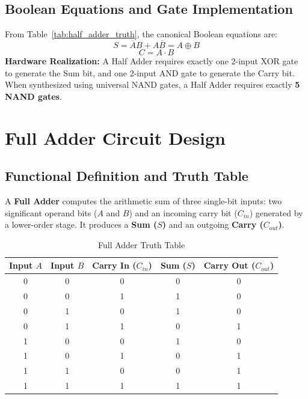 \subsection{Boolean Equations and Gate Implementation}
From Table~\ref{tab:half_adder_truth}, the canonical Boolean equations are:
\begin{equation}
\label{eq:half_adder_sum}
S = \overline{A}B + A\overline{B} = A \oplus B
\end{equation}
\begin{equation}
\label{eq:half_adder_carry}
C = A \cdot B
\end{equation}
\textbf{Hardware Realization:} A Half Adder requires exactly one 2-input XOR gate to generate the Sum bit, and one 2-input AND gate to generate the Carry bit. When synthesized using universal NAND gates, a Half Adder requires exactly \textbf{5 NAND gates}.


\section{Full Adder Circuit Design}
\label{sec:full_adder}

\subsection{Functional Definition and Truth Table}
A \textbf{Full Adder} computes the arithmetic sum of three single-bit inputs: two significant operand bits ($A$ and $B$) and an incoming carry bit ($C_{in}$) generated by a lower-order stage. It produces a \textbf{Sum ($S$)} and an outgoing \textbf{Carry ($C_{out}$)}.

\begin{table}[htbp]
\centering
\small
\caption{Full Adder Truth Table}
\label{tab:full_adder_truth}
\begin{tabular}{c c c c c}
\toprule
\textbf{Input $A$} & \textbf{Input $B$} & \textbf{Carry In ($C_{in}$)} & \textbf{Sum ($S$)} & \textbf{Carry Out ($C_{out}$)} \\
\midrule
0 & 0 & 0 & 0 & 0 \\
0 & 0 & 1 & 1 & 0 \\
0 & 1 & 0 & 1 & 0 \\
0 & 1 & 1 & 0 & 1 \\
1 & 0 & 0 & 1 & 0 \\
1 & 0 & 1 & 0 & 1 \\
1 & 1 & 0 & 0 & 1 \\
1 & 1 & 1 & 1 & 1 \\
\bottomrule
\end{tabular}
\end{table}

